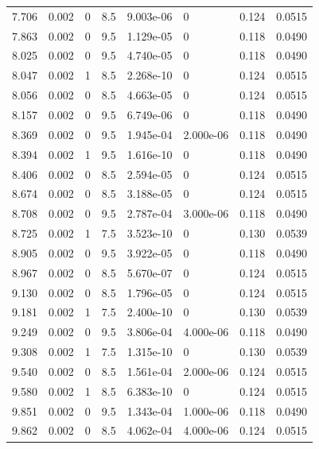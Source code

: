 \documentclass[preview]{standalone}
\begin{document}
{{{\begin{tabular}{L{1.2cm}C{1.2cm} C{0.3cm}C{0.5cm} C{1.4cm}C{1.4cm} C{1.4cm}C{1.4cm}}
  7.706  &  0.002  & 0     & 8.5 &  9.003e-06  & 0  & 0.124 &  0.0515   \\ 
  7.863  &  0.002  & 0     & 9.5 &  1.129e-05  & 0  & 0.118 &  0.0490   \\ 
  8.025  &  0.002  & 0     & 9.5 &  4.740e-05  & 0  & 0.118 &  0.0490   \\ 
  8.047  &  0.002  & 1     & 8.5 &  2.268e-10  & 0  & 0.124 &  0.0515   \\ 
  8.056  &  0.002  & 0     & 8.5 &  4.663e-05  & 0  & 0.124 &  0.0515   \\ 
  8.157  &  0.002  & 0     & 9.5 &  6.749e-06  & 0  & 0.118 &  0.0490   \\ 
  8.369  &  0.002  & 0     & 9.5 &  1.945e-04  & 2.000e-06  & 0.118 &  0.0490   \\ 
  8.394  &  0.002  & 1     & 9.5 &  1.616e-10  & 0  & 0.118 &  0.0490   \\ 
  8.406  &  0.002  & 0     & 8.5 &  2.594e-05  & 0  & 0.124 &  0.0515   \\ 
  8.674  &  0.002  & 0     & 8.5 &  3.188e-05  & 0  & 0.124 &  0.0515   \\ 
  8.708  &  0.002  & 0     & 9.5 &  2.787e-04  & 3.000e-06  & 0.118 &  0.0490   \\ 
  8.725  &  0.002  & 1     & 7.5 &  3.523e-10  & 0  & 0.130 &  0.0539   \\ 
  8.905  &  0.002  & 0     & 9.5 &  3.922e-05  & 0  & 0.118 &  0.0490   \\ 
  8.967  &  0.002  & 0     & 8.5 &  5.670e-07  & 0  & 0.124 &  0.0515   \\ 
  9.130  &  0.002  & 0     & 8.5 &  1.796e-05  & 0  & 0.124 &  0.0515   \\ 
  9.181  &  0.002  & 1     & 7.5 &  2.400e-10  & 0  & 0.130 &  0.0539   \\ 
  9.249  &  0.002  & 0     & 9.5 &  3.806e-04  & 4.000e-06  & 0.118 &  0.0490   \\ 
  9.308  &  0.002  & 1     & 7.5 &  1.315e-10  & 0  & 0.130 &  0.0539   \\ 
  9.540  &  0.002  & 0     & 8.5 &  1.561e-04  & 2.000e-06  & 0.124 &  0.0515   \\ 
  9.580  &  0.002  & 1     & 8.5 &  6.383e-10  & 0  & 0.124 &  0.0515   \\ 
  9.851  &  0.002  & 0     & 9.5 &  1.343e-04  & 1.000e-06  & 0.118 &  0.0490   \\ 
  9.862  &  0.002  & 0     & 8.5 &  4.062e-04  & 4.000e-06  & 0.124 &  0.0515   \\ 

\end{tabular}}}}
\end{document}
